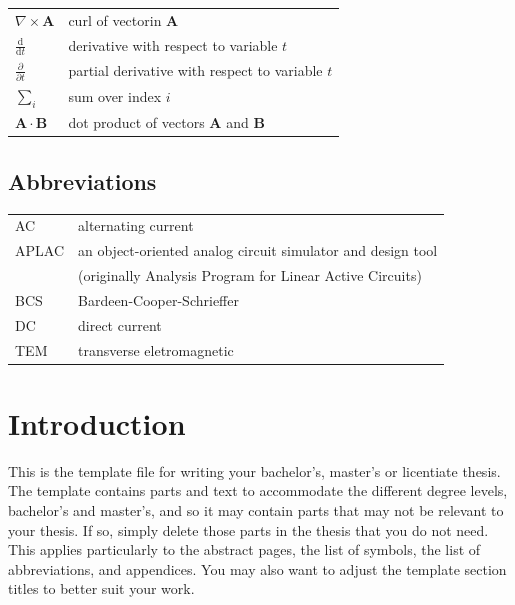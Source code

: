 \documentclass[english, 12pt, a4paper, biz, utf8, a-2b, online]{aaltothesis}
\begin{document}
\begin{tabular}{ll}
$\nabla \times \mathbf{A}$              & curl of vectorin $\mathbf{A}$\\
$\displaystyle\frac{\mbox{d}}{\mbox{d} t}$ & derivative with respect to 
variable $t$\\[3mm]
$\displaystyle\frac{\partial}{\partial t}$  & partial derivative with respect 
to variable $t$ \\[3mm]
$\sum_i $                       & sum over index $i$\\
$\mathbf{A} \cdot \mathbf{B}$    & dot product of vectors $\mathbf{A}$ and 
$\mathbf{B}$
\end{tabular}

\subsection*{Abbreviations}

\begin{tabular}{ll}
AC         & alternating current \\
APLAC      & an object-oriented analog circuit simulator and design tool \\
           & (originally Analysis Program for Linear Active Circuits) \\
BCS        & Bardeen-Cooper-Schrieffer \\ %
DC         & direct current \\
TEM        & transverse eletromagnetic
\end{tabular}


\cleardoublepage

\section{Introduction}
\label{sec:intro}

\thispagestyle{empty}

This is the template file for writing your bachelor’s, master’s or licentiate 
thesis. The template contains parts and text to accommodate the different degree 
levels, bachelor’s and master’s, and so it may contain parts that may not be 
relevant to your thesis. If so, simply delete those parts in the thesis that you
do not need. This applies particularly to the abstract pages, the list of
symbols, the list of abbreviations, and appendices. You may also want to adjust
the template section titles to better suit your work.
\end{document}
